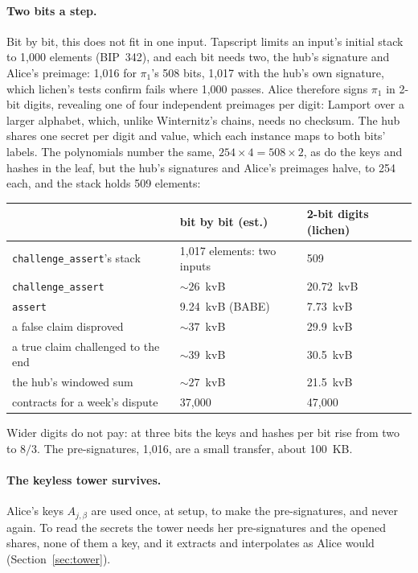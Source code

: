 \documentclass[11pt]{article}
\newcommand{\tx}[1]{\texttt{#1}}
\begin{document}
\paragraph{Two bits a step.} Bit by bit, this does not fit in one
input. Tapscript limits an input's initial stack to 1,000 elements
(BIP~342), and each bit needs two, the hub's signature and Alice's
preimage: 1,016 for $\pi_1$'s 508 bits, 1,017 with the hub's own
signature, which lichen's tests confirm fails where 1,000 passes. Alice
therefore signs $\pi_1$ in 2-bit digits, revealing one of four
independent preimages per digit: Lamport over a larger alphabet, which,
unlike Winternitz's chains, needs no checksum. The hub shares one secret
per digit and value, which each instance maps to both bits' labels. The
polynomials number the same, $254 \times 4 = 508 \times 2$, as do the
keys and hashes in the leaf, but the hub's signatures and Alice's
preimages halve, to 254 each, and the stack holds 509 elements:
\begin{center}
\small
\begin{tabularx}{\linewidth}{>{\raggedright\arraybackslash}p{50mm}LL}
\toprule
& bit by bit (est.) & 2-bit digits (lichen) \\
\midrule
\tx{challenge\_assert}'s stack & 1,017 elements: two inputs & 509 \\
\tx{challenge\_assert} & ${\sim}26$~kvB & 20.72~kvB \\
\tx{assert} & 9.24~kvB (BABE) & 7.73~kvB \\
a false claim disproved & ${\sim}37$~kvB & 29.9~kvB \\
a true claim challenged to the end & ${\sim}39$~kvB & 30.5~kvB \\
the hub's windowed sum & ${\sim}27$~kvB & 21.5~kvB \\
contracts for a week's dispute & 37,000 & 47,000 \\
\bottomrule
\end{tabularx}
\end{center}
Wider digits do not pay: at three bits the keys and hashes per bit rise
from two to $8/3$. The pre-signatures, 1,016, are a small transfer,
about 100~KB.

\paragraph{The keyless tower survives.} Alice's keys $A_{j,\beta}$ are
used once, at setup, to make the pre-signatures, and never again. To
read the secrets the tower needs her pre-signatures and the opened
shares, none of them a key, and it extracts and interpolates as Alice
would (Section~\ref{sec:tower}).
\end{document}
